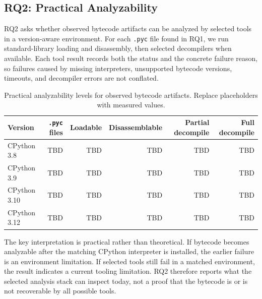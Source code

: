 
\subsection{RQ2: Practical Analyzability}\label{sec:RQ2}

RQ2 asks whether observed bytecode artifacts can be analyzed by selected tools in a version-aware environment.  For each \texttt{.pyc} file found in RQ1, we run standard-library loading and disassembly, then selected decompilers when available.  Each tool result records both the status and the concrete failure reason, so failures caused by missing interpreters, unsupported bytecode versions, timeouts, and decompiler errors are not conflated.

\begin{table}[t]
  \centering
  \caption{Practical analyzability levels for observed bytecode artifacts. Replace placeholders with measured values.}
  \label{tab:tool-analyzability}
  \begin{tabular}{lrrrrr}
    \toprule
    Version & \texttt{.pyc} files & Loadable & Disassemblable & Partial decompile & Full decompile \\
    \midrule
    CPython 3.8 & TBD & TBD & TBD & TBD & TBD \\
    CPython 3.9 & TBD & TBD & TBD & TBD & TBD \\
    CPython 3.10 & TBD & TBD & TBD & TBD & TBD \\
    CPython 3.12 & TBD & TBD & TBD & TBD & TBD \\
    \bottomrule
  \end{tabular}
\end{table}

The key interpretation is practical rather than theoretical.  If bytecode becomes analyzable after the matching CPython interpreter is installed, the earlier failure is an environment limitation.  If selected tools still fail in a matched environment, the result indicates a current tooling limitation.  RQ2 therefore reports what the selected analysis stack can inspect today, not a proof that the bytecode is or is not recoverable by all possible tools.
